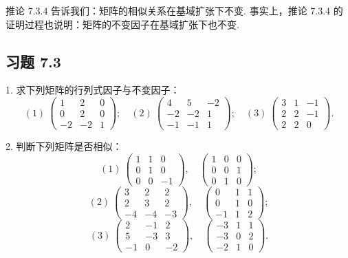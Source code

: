 \documentclass[UTF8,12pt,a4paper,fontset=fandol]{ctexart}
\begin{document}
推论 7.3.4 告诉我们：矩阵的相似关系在基域扩张下不变. 事实上，推论 7.3.4 的证明过程也说明：矩阵的不变因子在基域扩张下也不变.

\subsection*{习题 7.3}

1. 求下列矩阵的行列式因子与不变因子：
\[
(1)\ \left(\begin{array}{ccc}
1 & 2 & 0\\
0 & 2 & 0\\
-2 & -2 & 1
\end{array}\right);\quad
(2)\ \left(\begin{array}{ccc}
4 & 5 & -2\\
-2 & -2 & 1\\
-1 & -1 & 1
\end{array}\right);\quad
(3)\ \left(\begin{array}{ccc}
3 & 1 & -1\\
2 & 2 & -1\\
2 & 2 & 0
\end{array}\right).
\]

2. 判断下列矩阵是否相似：
\[
(1)\ \left(\begin{array}{ccc}
1 & 1 & 0\\
0 & 1 & 0\\
0 & 0 & -1
\end{array}\right),\quad
\left(\begin{array}{ccc}
1 & 0 & 0\\
0 & 0 & 1\\
0 & 1 & 0
\end{array}\right);
\]
\[
(2)\ \left(\begin{array}{ccc}
3 & 2 & 2\\
2 & 3 & 2\\
-4 & -4 & -3
\end{array}\right),\quad
\left(\begin{array}{ccc}
0 & 1 & 1\\
0 & 1 & 0\\
-1 & 1 & 2
\end{array}\right);
\]
\[
(3)\ \left(\begin{array}{ccc}
2 & -1 & 2\\
5 & -3 & 3\\
-1 & 0 & -2
\end{array}\right),\quad
\left(\begin{array}{ccc}
-3 & 1 & 1\\
-3 & 0 & 2\\
-2 & 1 & 0
\end{array}\right).
\]
\end{document}
